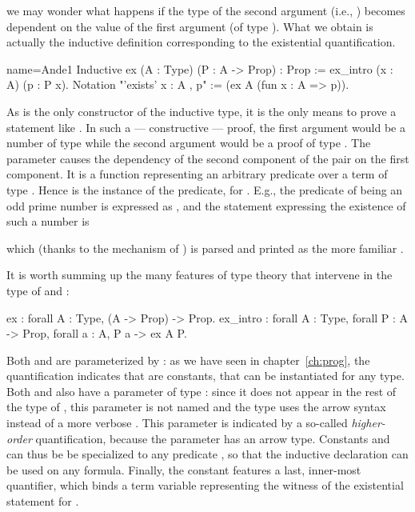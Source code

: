 we may wonder what happens if the type of the second argument (i.e., )
becomes dependent on the value of the first argument (of type ).
What we obtain is actually the inductive definition corresponding to the
existential quantification.

\begin{coq}{name=Ande1}{}
Inductive ex (A : Type) (P : A -> Prop) : Prop :=
  ex_intro (x : A) (p : P x).
Notation "'exists' x : A , p" := (ex A (fun x : A => p)).
\end{coq}

As   is the only constructor of the  inductive
type, it is the only means to prove a statement like
.  In such a --- constructive --- proof, the first
argument would be a number
 of type  while the second argument would be a proof  of type
.  The parameter  causes the dependency of the
second component of the pair on the first component. It is a function
representing an arbitrary predicate over a term of
type .  Hence  is the instance of the predicate, for .  E.g.,
the predicate of being an odd prime number is expressed as
, and the statement expressing the
existence of such a number is

\centerline{} 
which (thanks to the  mechanism of \Coq{}) is parsed and
printed as the more familiar .

It is worth summing up the many features of type theory that
intervene in the type of  and :

\begin{coq}{}{}
ex : forall A : Type, (A -> Prop) -> Prop.
ex_intro : forall A : Type, forall P : A -> Prop, forall a : A, P a -> ex A P.
\end{coq}

Both  and  are parameterized by : as
we have seen in chapter~\ref{ch:prog}, the 
quantification indicates that  are  
constants, that can be instantiated for any type. Both  and
 also have a parameter of type  : since it
does not appear in the rest of the type of , this parameter is
not named and the type uses the arrow syntax instead of a more verbose
. This parameter is
indicated by a so-called \emph{higher-order} quantification, because
the parameter has an arrow type. Constants   and 
can thus be  be specialized to any predicate , so that the 
inductive declaration can be used on any formula. Finally, the
 constant features a last, inner-most 
quantifier, which binds a term variable  representing the witness
of the existential statement for .\\

